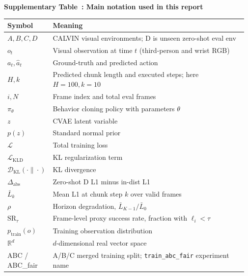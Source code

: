 \documentclass[10pt,twocolumn,letterpaper]{article}
\newcounter{apptab}
\renewcommand{\theapptab}{\arabic{apptab}}
\begin{document}
\makeatletter
\if@twocolumn\onecolumn\fi
\makeatother

\begin{table}[H]
  \label{apptab:notation}%
  \centering
  \vspace{\abovecaptionskip}%
  {\footnotesize\bfseries Supplementary Table~\theapptab: Main notation used in this report\par}%
  \vspace{\belowcaptionskip}%
  \scriptsize
  \setlength{\tabcolsep}{2pt}
  \renewcommand{\arraystretch}{1.05}
  \begin{tabular}{@{}>{\raggedright\arraybackslash}p{0.12\linewidth}>{\raggedright\arraybackslash}p{0.85\linewidth}@{}}
    \toprule
    Symbol & Meaning \\
    \midrule
    $A,B,C,D$ & CALVIN visual environments; D is unseen zero-shot eval env \\
    $o_t$ & Visual observation at time $t$ (third-person and wrist RGB) \\
    $a_t,\hat{a}_t$ & Ground-truth and predicted action \\
    $H,k$ & Predicted chunk length and executed steps; here $H{=}100,k{=}10$ \\
    $i,N$ & Frame index and total eval frames \\
    $\pi_\theta$ & Behavior cloning policy with parameters $\theta$ \\
    $z$ & CVAE latent variable \\
    $p(z)$ & Standard normal prior \\
    $\mathcal{L}$ & Total training loss \\
    $\mathcal{L}_{\mathrm{KLD}}$ & KL regularization term \\
    $\mathcal{D}_{\mathrm{KL}}(\cdot\|\cdot)$ & KL divergence \\
    $\Delta_{\mathrm{abs}}$ & Zero-shot D L1 minus in-dist L1 \\
    $\bar{L}_k$ & Mean L1 at chunk step $k$ over valid frames \\
    $\rho$ & Horizon degradation, $\bar{L}_{K-1}/\bar{L}_0$ \\
    $\mathrm{SR}_{\tau}$ & Frame-level proxy success rate, fraction with $\ell_i<\tau$ \\
    $p_{\mathrm{train}}(o)$ & Training observation distribution \\
    $\mathbb{R}^d$ & $d$-dimensional real vector space \\
    ABC / ABC\_fair & A/B/C merged training split; \texttt{train\_abc\_fair} experiment name \\

\end{tabular}
\end{table}
\end{document}
